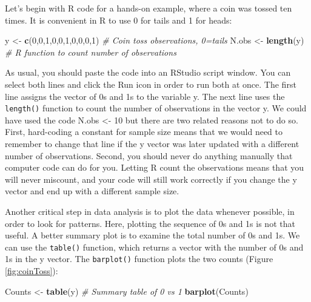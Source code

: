 \documentclass[
]{krantz}
\makeatletter
\newenvironment{Shaded}{\begin{snugshade}}{\end{snugshade}}
\newcommand{\CommentTok}[1]{\textcolor[rgb]{0.37,0.37,0.37}{\textit{#1}}}
\newcommand{\DecValTok}[1]{\textcolor[rgb]{0.06,0.06,0.06}{#1}}
\newcommand{\FunctionTok}[1]{\textcolor[rgb]{0.27,0.27,0.27}{\textbf{#1}}}
\newcommand{\NormalTok}[1]{#1}
\newcommand{\OtherTok}[1]{\textcolor[rgb]{0.37,0.37,0.37}{#1}}
\newenvironment{kframe}{%
\medskip{}
\setlength{\fboxsep}{.8em}
 \def\at@end@of@kframe{}%
 \ifinner\ifhmode%
  \def\at@end@of@kframe{\end{minipage}}%
  \begin{minipage}{\columnwidth}%
 \fi\fi%
 \def\FrameCommand##1{\hskip\@totalleftmargin \hskip-\fboxsep
 \colorbox{shadecolor}{##1}\hskip-\fboxsep
     \hskip-\linewidth \hskip-\@totalleftmargin \hskip\columnwidth}%
 \MakeFramed {\advance\hsize-\width
   \@totalleftmargin\z@ \linewidth\hsize
   \@setminipage}}%
 {\par\unskip\endMakeFramed%
 \at@end@of@kframe}
\renewenvironment{Shaded}{\begin{kframe}}{\end{kframe}}
\makeatother
\begin{document}
Let's begin with R code for a hands-on example, where a coin was tossed ten times. It is convenient in R to use 0 for tails and 1 for heads:

\begin{Shaded}
\begin{Highlighting}[]
\NormalTok{y }\OtherTok{\textless{}{-}} \FunctionTok{c}\NormalTok{(}\DecValTok{0}\NormalTok{,}\DecValTok{0}\NormalTok{,}\DecValTok{1}\NormalTok{,}\DecValTok{0}\NormalTok{,}\DecValTok{0}\NormalTok{,}\DecValTok{1}\NormalTok{,}\DecValTok{0}\NormalTok{,}\DecValTok{0}\NormalTok{,}\DecValTok{0}\NormalTok{,}\DecValTok{1}\NormalTok{)  }\CommentTok{\# Coin toss observations, 0=tails}
\NormalTok{N.obs }\OtherTok{\textless{}{-}} \FunctionTok{length}\NormalTok{(y) }\CommentTok{\# R function to count number of observations}
\end{Highlighting}
\end{Shaded}

As usual, you should paste the code into an RStudio script window. You can select both lines and click the Run icon in order to run both at once. The first line assigns the vector of 0s and 1s to the variable y. The next line uses the \texttt{length()} function to count the number of observations in the vector y. We could have used the code N.obs \textless- 10 but there are two related reasons not to do so. First, hard-coding a constant for sample size means that we would need to remember to change that line if the y vector was later updated with a different number of observations. Second, you should never do anything manually that computer code can do for you. Letting R count the observations means that you will never miscount, and your code will still work correctly if you change the y vector and end up with a different sample size.

Another critical step in data analysis is to plot the data whenever possible, in order to look for patterns. Here, plotting the sequence of 0s and 1s is not that useful. A better summary plot is to examine the total number of 0s and 1s. We can use the \texttt{table()} function, which returns a vector with the number of 0s and 1s in the y vector. The \texttt{barplot()} function plots the two counts (Figure \ref{fig:coinToss}):

\begin{Shaded}
\begin{Highlighting}[]
\NormalTok{Counts }\OtherTok{\textless{}{-}} \FunctionTok{table}\NormalTok{(y)  }\CommentTok{\# Summary table of 0 vs 1}
\FunctionTok{barplot}\NormalTok{(Counts)}
\end{Highlighting}
\end{Shaded}
\end{document}
